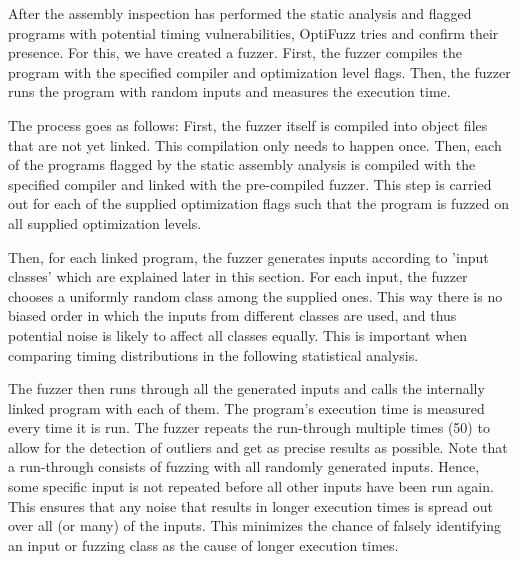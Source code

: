 After the assembly inspection has performed the static analysis and flagged programs with potential timing vulnerabilities, OptiFuzz tries and confirm their presence. 
For this, we have created a fuzzer. 
First, the fuzzer compiles the program with the specified compiler and optimization level flags.
Then, the fuzzer runs the program with random inputs and measures the execution time.

The process goes as follows: 
First, the fuzzer itself is compiled into object files that are not yet linked. 
This compilation only needs to happen once. 
Then, each of the programs flagged by the static assembly analysis is compiled with the specified compiler and linked with the pre-compiled fuzzer. 
This step is carried out for each of the supplied optimization flags such that the program is fuzzed on all supplied optimization levels.

Then, for each linked program, the fuzzer generates inputs according to 'input classes' which are explained later in this section. 
For each input, the fuzzer chooses a uniformly random class among the supplied ones. 
This way there is no biased order in which the inputs from different classes are used, and thus potential noise is likely to affect all classes equally. 
This is important when comparing timing distributions in the following statistical analysis. 

The fuzzer then runs through all the generated inputs and calls the internally linked program with each of them. 
The program's execution time is measured every time it is run. 
The fuzzer repeats the run-through multiple times (50) to allow for the detection of outliers and get as precise results as possible. 
Note that a run-through consists of fuzzing with all randomly generated inputs.
Hence, some specific input is not repeated before all other inputs have been run again. 
This ensures that any noise that results in longer execution times is spread out over all (or many) of the inputs. 
This minimizes the chance of falsely identifying an input or fuzzing class as the cause of longer execution times.

